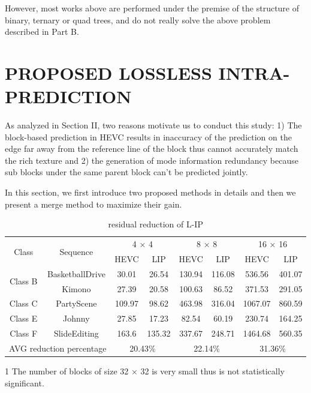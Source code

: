 \documentclass[journal]{IEEEtran}
\begin{document}
However, most works above are performed under the premise of the structure of binary, ternary or quad trees, and do not really solve the above problem described in Part B. 



\section{PROPOSED LOSSLESS INTRA-PREDICTION}
As analyzed in Section II, two reasons motivate us to conduct this study: 1) The block-based prediction in HEVC results in inaccuracy of the prediction on the edge far away from the reference line of the block thus cannot accurately match the rich texture and 2) the generation of mode information redundancy because sub blocks under the same parent block can't be predicted jointly.

In this section, we first introduce two proposed methods in details and then we present a merge method to maximize their gain.
 

\begin{table}[]

\centering
\caption{residual reduction of L-IP}
\label{table: residual reduction}
\begin{tabular}{c|c|c|c|c|c|c|c}
\toprule
\multirow{2}{*}{Class}  & \multirow{2}{*}{Sequence} & \multicolumn{2}{c|}{4 × 4}     & \multicolumn{2}{c|}{8 × 8}     & \multicolumn{2}{c}{16 × 16}   \\ \cline{3-8} 
                        &                           & HEVC          & LIP          & HEVC          & LIP          & HEVC          & LIP          \\ \hline
\multirow{2}{*}{Class B} & BasketballDrive           & 30.01         & 26.54        & 130.94        & 116.08       & 536.56        & 401.07       \\ \cline{2-8} 
                        & Kimono                    & 27.39         & 20.58        & 100.63        & 86.52        & 371.53        & 291.05       \\ \hline
Class C & PartyScene                & 109.97        & 98.62        & 463.98        & 316.04       & 1067.07       & 860.59       \\  \hline
Class E & Johnny                    & 27.85         & 17.23        & 82.54         & 60.19        & 230.74        & 164.25       \\ \hline
Class F & SlideEditing              & 163.6         & 135.32       & 337.67        & 248.71       & 1464.68       & 560.35       \\ \hline
\multicolumn{2}{c|}{AVG reduction   percentage}     & \multicolumn{2}{c|}{20.43\%} & \multicolumn{2}{c|}{22.14\%} & \multicolumn{2}{c}{31.36\%} \\ \bottomrule
\end{tabular}
\begin{tablenotes}
       \footnotesize
       \item[1]The number of blocks of size 32 × 32 is very small thus is not statistically significant.
     \end{tablenotes}
\end{table}
\end{document}
